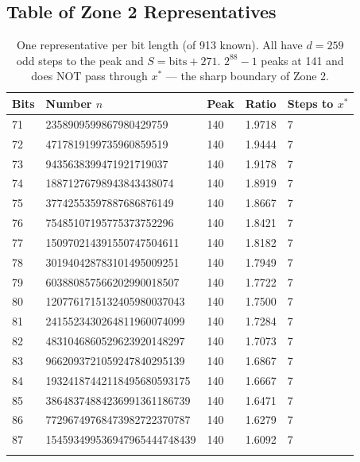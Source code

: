 \documentclass[12pt,a4paper]{article}
\theoremstyle{remark}
\begin{document}
\subsection{Table of Zone 2 Representatives}
\begin{longtable}{lllll}
\toprule
\textbf{Bits} & \textbf{Number $n$} & \textbf{Peak} & \textbf{Ratio} & \textbf{Steps to $x^*$} \\
\midrule
71 & 2358909599867980429759 & 140 & 1.9718 & 7 \\
72 & 4717819199735960859519 & 140 & 1.9444 & 7 \\
73 & 9435638399471921719037 & 140 & 1.9178 & 7 \\
74 & 18871276798943843438074 & 140 & 1.8919 & 7 \\
75 & 37742553597887686876149 & 140 & 1.8667 & 7 \\
76 & 75485107195775373752296 & 140 & 1.8421 & 7 \\
77 & 150970214391550747504611 & 140 & 1.8182 & 7 \\
78 & 301940428783101495009251 & 140 & 1.7949 & 7 \\
79 & 603880857566202990018507 & 140 & 1.7722 & 7 \\
80 & 1207761715132405980037043 & 140 & 1.7500 & 7 \\
81 & 2415523430264811960074099 & 140 & 1.7284 & 7 \\
82 & 4831046860529623920148297 & 140 & 1.7073 & 7 \\
83 & 9662093721059247840295139 & 140 & 1.6867 & 7 \\
84 & 19324187442118495680593175 & 140 & 1.6667 & 7 \\
85 & 38648374884236991361186739 & 140 & 1.6471 & 7 \\
86 & 77296749768473982722370787 & 140 & 1.6279 & 7 \\
87 & 154593499536947965444748439 & 140 & 1.6092 & 7 \\
\bottomrule
\caption*{One representative per bit length (of 913 known). All have $d=259$ odd steps to the peak and $S = \mathrm{bits}+271$. $2^{88}-1$ peaks at 141 and does NOT pass through $x^*$ --- the sharp boundary of Zone 2.}
\end{longtable}
\end{document}
